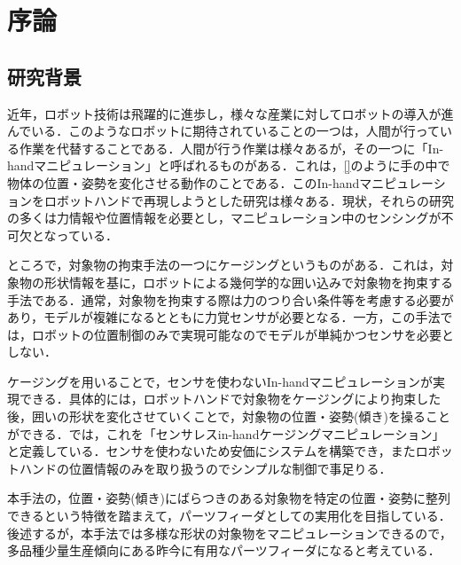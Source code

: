 \documentclass[a4paper,twoside,12pt,papersize, dvipdfmx]{iirthesis}
\begin{document}
    \newcommand{\figref}[1]{\figurename\ref{#1}}
    \newcommand{\tabref}[1]{\tablename\ref{#1}}
    \renewcommand{\eqref}[1]{式~(\ref{#1})}
    \newcommand{\chapref}[1]{\ref{#1}章}
    \newcommand{\secref}[1]{\ref{#1}節}
    \newcommand{\ssecref}[1]{\ref{#1}項}
    \newcommand{\appref}[1]{付録\ref{#1}}
\fi


\chapter{序論}\label{chap::intro}
\minitoc

\section{研究背景}\label{sec::intro::background}
近年，ロボット技術は飛躍的に進歩し，様々な産業に対してロボットの導入が進んでいる．このようなロボットに期待されていることの一つは，人間が行っている作業を代替することである．人間が行う作業は様々あるが，その一つに「In-handマニピュレーション」と呼ばれるものがある．これは，\figref{}のように手の中で物体の位置・姿勢を変化させる動作のことである．このIn-handマニピュレーションをロボットハンドで再現しようとした研究は様々ある．現状，それらの研究の多くは力情報や位置情報を必要とし，マニピュレーション中のセンシングが不可欠となっている．\par

ところで，対象物の拘束手法の一つにケージング\cite{rimon1999}というものがある．これは，対象物の形状情報を基に，ロボットによる幾何学的な囲い込みで対象物を拘束する手法である．通常，対象物を拘束する際は力のつり合い条件等を考慮する必要があり，モデルが複雑になるとともに力覚センサが必要となる．一方，この手法では，ロボットの位置制御のみで実現可能なのでモデルが単純かつセンサを必要としない．\par

ケージングを用いることで，センサを使わないIn-handマニピュレーションが実現できる．具体的には，ロボットハンドで対象物をケージングにより拘束した後，囲いの形状を変化させていくことで，対象物の位置・姿勢(傾き)を操ることができる．\cite{komiyama2021}では，これを「センサレスin-handケージングマニピュレーション」と定義している．センサを使わないため安価にシステムを構築でき，またロボットハンドの位置情報のみを取り扱うのでシンプルな制御で事足りる．\par

本手法の，位置・姿勢(傾き)にばらつきのある対象物を特定の位置・姿勢に整列できるという特徴を踏まえて，パーツフィーダとしての実用化を目指している．後述するが，本手法では多様な形状の対象物をマニピュレーションできるので，多品種少量生産傾向にある昨今に有用なパーツフィーダになると考えている．
\end{document}
